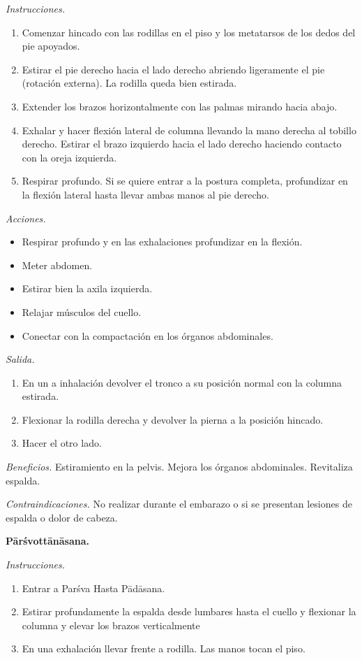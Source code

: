 \emph{Instrucciones.}
\begin{enumerate}
\item Comenzar hincado con las rodillas en el
piso y los metatarsos de los dedos del pie
apoyados.
\item Estirar el pie derecho hacia el lado
derecho abriendo ligeramente el pie (rotación
externa). La rodilla queda bien estirada.
\item Extender los brazos horizontalmente con
las palmas mirando hacia abajo.
\item Exhalar y hacer flexión lateral de
columna llevando la mano derecha al tobillo
derecho. Estirar el brazo izquierdo hacia el
lado derecho haciendo contacto con la oreja
izquierda.
\item Respirar profundo. Si se quiere entrar
a la postura completa, profundizar en la
flexión lateral hasta llevar ambas manos al
pie derecho.
\end{enumerate}

\emph{Acciones.}
\begin{itemize}
\item Respirar profundo y en las exhalaciones
profundizar en la flexión.
\item Meter abdomen.
\item Estirar bien la axila izquierda.
\item Relajar músculos del cuello.
\item Conectar con la compactación en los
órganos abdominales.
\end{itemize}

\emph{Salida.}
\begin{enumerate}
\item En un a inhalación devolver el tronco a
su posición normal con la columna estirada.
\item Flexionar la rodilla derecha y devolver
la pierna a la posición hincado.
\item Hacer el otro lado.
\end{enumerate}

\emph{Beneficios.} Estiramiento en la pelvis.
Mejora los órganos abdominales. Revitaliza
espalda.

\emph{Contraindicaciones.} No realizar
durante el embarazo o si se presentan
lesiones de espalda o dolor de cabeza.

\medskip\noindent\textbf{Pārśvottānāsana.}

\emph{Instrucciones.}
\begin{enumerate}
\item Entrar a Parśva Hasta Pādāsana.
\item Estirar profundamente la espalda desde
lumbares hasta el cuello y flexionar la
columna y elevar los brazos verticalmente
\item En una exhalación llevar frente a
rodilla. Las manos tocan el piso.
\end{enumerate}

